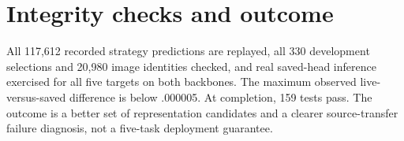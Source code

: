 \section{Integrity checks and outcome}
All 117,612 recorded strategy predictions are replayed, all 330 development selections and 20,980 image identities checked, and real saved-head inference exercised for all five targets on both backbones. The maximum observed live-versus-saved difference is below .000005. At completion, 159 tests pass. The outcome is a better set of representation candidates and a clearer source-transfer failure diagnosis, not a five-task deployment guarantee.
